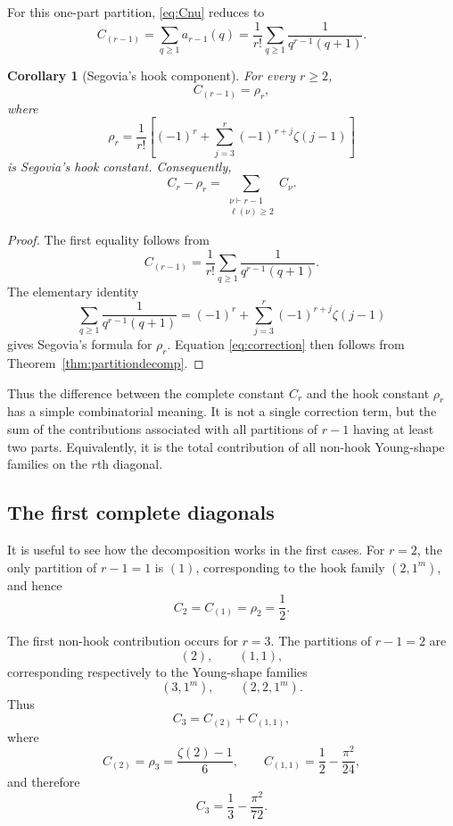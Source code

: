 \documentclass[11pt]{article}
\newtheorem{corollary}[theorem]{Corollary}
\theoremstyle{definition}
\begin{document}
For this one-part partition, \eqref{eq:Cnu} reduces to
\[
 C_{(r-1)}
 =
 \sum_{q\geq1}a_{r-1}(q)
 =
 \frac1{r!}
 \sum_{q\geq1}
 \frac1{q^{r-1}(q+1)}.
\]

\begin{corollary}[Segovia's hook component]
\label{cor:hook}
For every $r\geq2$,
\begin{equation}\label{eq:hook}
        C_{(r-1)}=\rho_r,
\end{equation}
where
\[
 \rho_r
 =
 \frac1{r!}
 \left[
 (-1)^r+
 \sum_{j=3}^{r}
 (-1)^{r+j}\zeta(j-1)
 \right]
\]
is Segovia's hook constant.  Consequently,
\begin{equation}\label{eq:correction}
        C_r-\rho_r
        =
        \sum_{\substack{\nu\vdash r-1\\
                        \ell(\nu)\geq2}}
        C_\nu.
\end{equation}
\end{corollary}

\begin{proof}
The first equality follows from
\[
 C_{(r-1)}
 =
 \frac1{r!}
 \sum_{q\geq1}
 \frac1{q^{r-1}(q+1)}.
\]
The elementary identity
\[
 \sum_{q\geq1}
 \frac1{q^{r-1}(q+1)}
 =
 (-1)^r+
 \sum_{j=3}^{r}
 (-1)^{r+j}\zeta(j-1)
\]
gives Segovia's formula for $\rho_r$.  Equation
\eqref{eq:correction} then follows from
Theorem~\ref{thm:partitiondecomp}.
\end{proof}

Thus the difference between the complete constant $C_r$ and the hook
constant $\rho_r$ has a simple combinatorial meaning.  It is not a
single correction term, but the sum of the contributions associated
with all partitions of $r-1$ having at least two parts.  Equivalently,
it is the total contribution of all non-hook Young-shape families on
the $r$th diagonal.

\subsection{The first complete diagonals}

It is useful to see how the decomposition works in the first cases.
For $r=2$, the only partition of $r-1=1$ is $(1)$, corresponding to
the hook family $(2,1^m)$, and hence
\[
        C_2=C_{(1)}=\rho_2=\frac12.
\]

The first non-hook contribution occurs for $r=3$.  The partitions of
$r-1=2$ are
\[
        (2),\qquad (1,1),
\]
corresponding respectively to the Young-shape families
\[
        (3,1^m),\qquad (2,2,1^m).
\]
Thus
\[
        C_3=C_{(2)}+C_{(1,1)},
\]
where
\[
        C_{(2)}=\rho_3=\frac{\zeta(2)-1}{6},
        \qquad
        C_{(1,1)}=\frac12-\frac{\pi^2}{24},
\]
and therefore
\[
        C_3=\frac13-\frac{\pi^2}{72}.
\]
\end{document}
